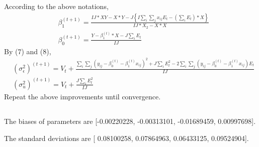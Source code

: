 \documentclass{article}
\begin{document}
		According to the above notations, 
		\begin{align*}
			&\beta_1^{(t+1)} = \frac{IJ*XY - X*Y - J\left\{ I\sum_i \sum_j x_{ij}E_t - (\sum_i E_t)*X \right\}}{IJ*X_2 - X*X}\\[10pt]
			&\beta_0^{(t+1)} = \frac{Y - \beta_1^{(t)}*X - J \sum_i E_t}{IJ}
		\end{align*}
		By (7) and (8), 
		\begin{align*}
			&(\sigma_\epsilon^2)^{(t+1)} = V_t + \frac{\sum_i \sum_j (y_{ij} - \beta_0^{(t)} - \beta_1^{(t)}x_{ij})^2 + J \sum_i E_t^2 - 2\sum_i \sum_j (y_{ij} - \beta_0^{(t)} - \beta_1^{(t)}x_{ij})E_t}{IJ}\\[10pt]
			&(\sigma_u^2)^{(t+1)} = V_t + \frac{J\sum_i E_t^2}{IJ}
		\end{align*}
		Repeat the above improvements until convergence.
	\subsection{}
		
		\par
		The biases of parameters are [-0.00220228, -0.00313101, -0.01689459,  0.00997698].
		\par
		The standard deviations are [ 0.08100258,  0.07864963,  0.06433125,  0.09524904].
\end{document}
